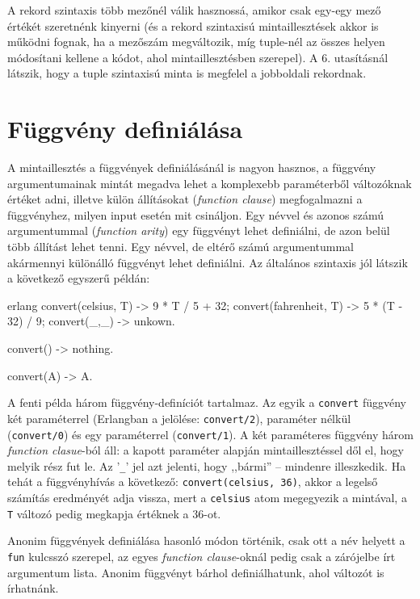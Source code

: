\documentclass[12pt, a4paper, oneside]{book}
\begin{document}
\noindent A rekord szintaxis több mezőnél válik hasznossá, amikor csak egy-egy
mező értékét szeretnénk kinyerni (és a rekord szintaxisú mintaillesztések akkor
is működni fognak, ha a mezőszám megváltozik, míg tuple-nél az összes helyen
módosítani kellene a kódot, ahol mintaillesztésben szerepel). A 6. utasításnál
látszik, hogy a tuple szintaxisú minta is megfelel a jobboldali rekordnak.

\section{Függvény definiálása} A mintaillesztés a függvények definiálásánál
is nagyon hasznos, a függvény argumentumainak mintát megadva lehet a komplexebb
paraméterből változóknak értéket adni, illetve külön állításokat
(\emph{function clause}) megfogalmazni a függvényhez, milyen input esetén mit
csináljon. Egy névvel és azonos számú argumentummal (\emph{function arity})
egy függvényt lehet definiálni, de azon belül több állítást lehet tenni. Egy
névvel, de eltérő számú argumentummal akármennyi különálló függvényt lehet
definiálni. Az általános szintaxis jól látszik a következő egyszerű példán:

\begin{code}{erlang}{}
convert(celsius, T) ->
  9 * T / 5 + 32;
convert(fahrenheit, T) ->
  5 * (T - 32) / 9;
convert(_,_) ->
  unkown.

convert() ->
  nothing.

convert(A) ->
  A.
\end{code}

A fenti példa három függvény-definíciót tartalmaz. Az egyik a \texttt{convert}
függvény két paraméterrel (Erlangban a jelölése: \texttt{convert/2}), paraméter
nélkül (\texttt{convert/0}) és egy paraméterrel (\texttt{convert/1}). A két
paraméteres függvény három \emph{function clasue}-ból áll: a kapott paraméter
alapján mintaillesztéssel dől el, hogy melyik rész fut le. Az '\texttt{\_}' jel
azt jelenti, hogy ,,bármi'' -- mindenre illeszkedik. Ha tehát a függvényhívás a
következő: \texttt{convert(celsius, 36)}, akkor a legelső számítás eredményét
adja vissza, mert a \texttt{celsius} atom megegyezik a mintával, a \texttt{T}
változó pedig megkapja értéknek a 36-ot.

Anonim függvények definiálása hasonló módon történik, csak ott a név helyett a
\texttt{fun} kulcsszó szerepel, az egyes \emph{function clause}-oknál pedig
csak a zárójelbe írt argumentum lista. Anonim függvényt bárhol definiálhatunk,
ahol változót is írhatnánk.
\end{document}
